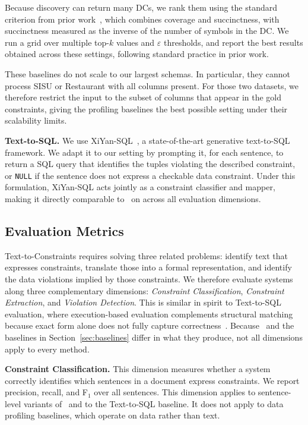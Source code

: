 Because discovery can return many DCs, we rank them using the standard
criterion from prior work~\cite{chu2013discovering}, which combines coverage
and succinctness, with succinctness measured as the inverse of the number of
symbols in the DC. We run a grid over multiple top-$k$ values and
$\varepsilon$ thresholds, and report the best results obtained across these settings, following standard practice in prior work.

These baselines do not scale to our largest schemas. In particular, they
cannot process SISU or Restaurant with all columns present. For those two
datasets, we therefore restrict the input to the subset of columns that appear
in the gold constraints, giving the profiling baselines the best possible
setting under their scalability limits.


\smallskip\noindent\textbf{Text-to-SQL.}
We use XiYan-SQL~\cite{XiYanSQL}, a state-of-the-art generative text-to-SQL
framework. We adapt it to our setting by prompting it, for each sentence, to
return a SQL query that identifies the tuples violating the described
constraint, or \texttt{NULL} if the sentence does not express a checkable data
constraint. Under this formulation, XiYan-SQL acts jointly as a constraint
classifier and mapper, making it directly comparable to \system\ on  across all
evaluation dimensions.


\subsection{Evaluation Metrics}
\label{sec:metrics}

Text-to-Constraints requires solving three related problems: identify
text that expresses constraints, translate those into a formal
representation, and identify the data violations implied by those constraints.
We therefore evaluate systems along three complementary dimensions:
\textit{Constraint Classification}, \textit{Constraint Extraction}, and
\textit{Violation Detection}. This is similar in spirit to Text-to-SQL evaluation, where
execution-based evaluation complements structural matching because exact form
alone does not fully capture correctness~\cite{zhong-etal-2020-semantic}. Because \system\ and the
baselines in Section~\ref{sec:baselines} differ in what they produce, not all
dimensions apply to every method.

\smallskip\noindent\textbf{Constraint Classification.}
This dimension measures whether a system correctly identifies which sentences
in a document express constraints. We report precision, recall, and F$_1$
over all sentences. This dimension applies to sentence-level variants of
\system\ and to the Text-to-SQL baseline. It does not apply to data profiling
baselines, which operate on data rather than text.


